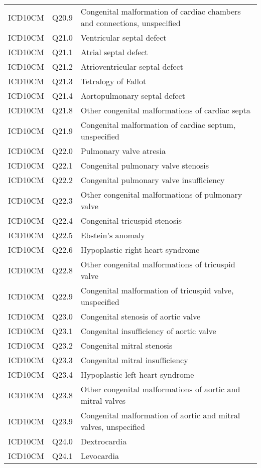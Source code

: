 \begin{longtable}{p{}p{}p{}}
  ICD10CM & Q20.9 & Congenital malformation of cardiac chambers and connections, unspecified \\ 
  ICD10CM & Q21.0 & Ventricular septal defect \\ 
  ICD10CM & Q21.1 & Atrial septal defect \\ 
  ICD10CM & Q21.2 & Atrioventricular septal defect \\ 
  ICD10CM & Q21.3 & Tetralogy of Fallot \\ 
  ICD10CM & Q21.4 & Aortopulmonary septal defect \\ 
  ICD10CM & Q21.8 & Other congenital malformations of cardiac septa \\ 
  ICD10CM & Q21.9 & Congenital malformation of cardiac septum, unspecified \\ 
  ICD10CM & Q22.0 & Pulmonary valve atresia \\ 
  ICD10CM & Q22.1 & Congenital pulmonary valve stenosis \\ 
  ICD10CM & Q22.2 & Congenital pulmonary valve insufficiency \\ 
  ICD10CM & Q22.3 & Other congenital malformations of pulmonary valve \\ 
  ICD10CM & Q22.4 & Congenital tricuspid stenosis \\ 
  ICD10CM & Q22.5 & Ebstein's anomaly \\ 
  ICD10CM & Q22.6 & Hypoplastic right heart syndrome \\ 
  ICD10CM & Q22.8 & Other congenital malformations of tricuspid valve \\ 
  ICD10CM & Q22.9 & Congenital malformation of tricuspid valve, unspecified \\ 
  ICD10CM & Q23.0 & Congenital stenosis of aortic valve \\ 
  ICD10CM & Q23.1 & Congenital insufficiency of aortic valve \\ 
  ICD10CM & Q23.2 & Congenital mitral stenosis \\ 
  ICD10CM & Q23.3 & Congenital mitral insufficiency \\ 
  ICD10CM & Q23.4 & Hypoplastic left heart syndrome \\ 
  ICD10CM & Q23.8 & Other congenital malformations of aortic and mitral valves \\ 
  ICD10CM & Q23.9 & Congenital malformation of aortic and mitral valves, unspecified \\ 
  ICD10CM & Q24.0 & Dextrocardia \\ 
  ICD10CM & Q24.1 & Levocardia \\ 

\end{longtable}
